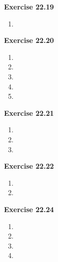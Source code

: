 \textbf{Exercise 22.19}
\begin{enumerate}
    \item 
\end{enumerate}

\textbf{Exercise 22.20}
\begin{enumerate}
    \item 
    \item 
    \item 
    \item 
    \item 
\end{enumerate}

\textbf{Exercise 22.21}
\begin{enumerate}
    \item 
    \item 
    \item 
\end{enumerate}

\textbf{Exercise 22.22}
\begin{enumerate}
    \item 
    \item 
\end{enumerate}

\textbf{Exercise 22.24}
\begin{enumerate}
    \item 
    \item 
    \item 
    \item 
\end{enumerate}


